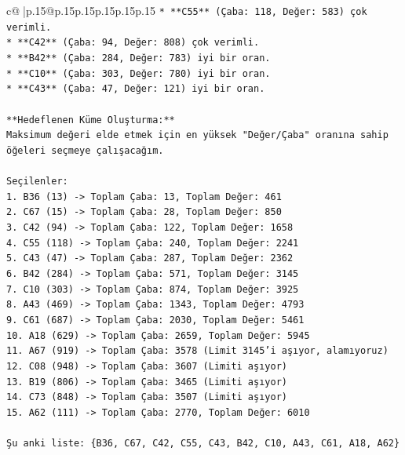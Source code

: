 \documentclass{article}
\begin{document}
{\begin{supertabular}{c@{$\;$}|p{.15\linewidth}@{}p{.15\linewidth}p{.15\linewidth}p{.15\linewidth}p{.15\linewidth}p{.15\linewidth}}
{{{\texttt{*   **C55** (Çaba: 118, Değer: 583) çok verimli.} \\
\texttt{*   **C42** (Çaba: 94, Değer: 808) çok verimli.} \\
\texttt{*   **B42** (Çaba: 284, Değer: 783) iyi bir oran.} \\
\texttt{*   **C10** (Çaba: 303, Değer: 780) iyi bir oran.} \\
\texttt{*   **C43** (Çaba: 47, Değer: 121) iyi bir oran.} \\
\\ 
\texttt{**Hedeflenen Küme Oluşturma:**} \\
\texttt{Maksimum değeri elde etmek için en yüksek "Değer/Çaba" oranına sahip öğeleri seçmeye çalışacağım.} \\
\\ 
\texttt{Seçilenler:} \\
\texttt{1.  B36 (13) {-}> Toplam Çaba: 13, Toplam Değer: 461} \\
\texttt{2.  C67 (15) {-}> Toplam Çaba: 28, Toplam Değer: 850} \\
\texttt{3.  C42 (94) {-}> Toplam Çaba: 122, Toplam Değer: 1658} \\
\texttt{4.  C55 (118) {-}> Toplam Çaba: 240, Toplam Değer: 2241} \\
\texttt{5.  C43 (47) {-}> Toplam Çaba: 287, Toplam Değer: 2362} \\
\texttt{6.  B42 (284) {-}> Toplam Çaba: 571, Toplam Değer: 3145} \\
\texttt{7.  C10 (303) {-}> Toplam Çaba: 874, Toplam Değer: 3925} \\
\texttt{8.  A43 (469) {-}> Toplam Çaba: 1343, Toplam Değer: 4793} \\
\texttt{9.  C61 (687) {-}> Toplam Çaba: 2030, Toplam Değer: 5461} \\
\texttt{10. A18 (629) {-}> Toplam Çaba: 2659, Toplam Değer: 5945} \\
\texttt{11. A67 (919) {-}> Toplam Çaba: 3578 (Limit 3145'i aşıyor, alamıyoruz)} \\
\texttt{12. C08 (948) {-}> Toplam Çaba: 3607 (Limiti aşıyor)} \\
\texttt{13. B19 (806) {-}> Toplam Çaba: 3465 (Limiti aşıyor)} \\
\texttt{14. C73 (848) {-}> Toplam Çaba: 3507 (Limiti aşıyor)} \\
\texttt{15. A62 (111) {-}> Toplam Çaba: 2770, Toplam Değer: 6010} \\
\\ 
\texttt{Şu anki liste: \{B36, C67, C42, C55, C43, B42, C10, A43, C61, A18, A62\}} \\
}}}
\end{supertabular}}
\end{document}
